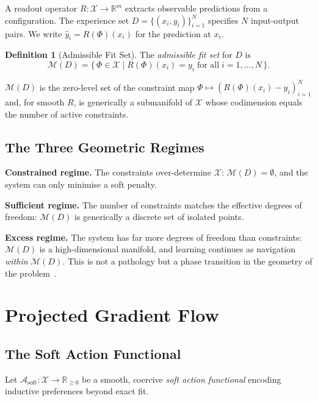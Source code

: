 \documentclass[12pt,oneside]{article}
\theoremstyle{plain}
\theoremstyle{definition}
\newtheorem{definition}[theorem]{Definition}
\theoremstyle{remark}
\newcommand{\X}{\mathcal{X}}
\newcommand{\M}{\mathcal{M}}
\newcommand{\D}{D}
\newcommand{\Asoft}{\mathcal{A}_{\mathrm{soft}}}
\begin{document}
A readout operator $R : \X \to \mathbb{R}^m$ extracts observable predictions
from a configuration. The experience set $\D = \{(x_i, y_i)\}_{i=1}^N$
specifies $N$ input-output pairs. We write $\hat{y}_i = R(\Phi)(x_i)$ for the
prediction at $x_i$.

\begin{definition}[Admissible Fit Set]
The \emph{admissible fit set} for $\D$ is
\[
  \M(\D) = \bigl\{\,\Phi \in \X \;\big|\; R(\Phi)(x_i) = y_i
  \;\text{for all}\; i = 1,\dotsc,N\,\bigr\}.
\]
\end{definition}

$\M(\D)$ is the zero-level set of the constraint map $\Phi \mapsto
(R(\Phi)(x_i) - y_i)_{i=1}^N$ and, for smooth $R$, is generically a
submanifold of $\X$ whose codimension equals the number of active constraints.

\subsection{The Three Geometric Regimes}

\noindent\textbf{Constrained regime.} The constraints over-determine $\X$:
$\M(\D) = \emptyset$, and the system can only minimise a soft penalty.

\medskip\noindent\textbf{Sufficient regime.} The number of constraints matches
the effective degrees of freedom: $\M(\D)$ is generically a discrete set of
isolated points.

\medskip\noindent\textbf{Excess regime.} The system has far more degrees of
freedom than constraints: $\M(\D)$ is a high-dimensional manifold, and learning
continues as navigation \emph{within} $\M(\D)$. This is not a pathology but a
phase transition in the geometry of the problem~\cite{Belkin2019,DubovaSloman2026}.

\section{Projected Gradient Flow}
\label{sec:dynamics}

\subsection{The Soft Action Functional}

Let $\Asoft : \X \to \mathbb{R}_{\geq 0}$ be a smooth, coercive \emph{soft
action functional} encoding inductive preferences beyond exact fit.
\end{document}
